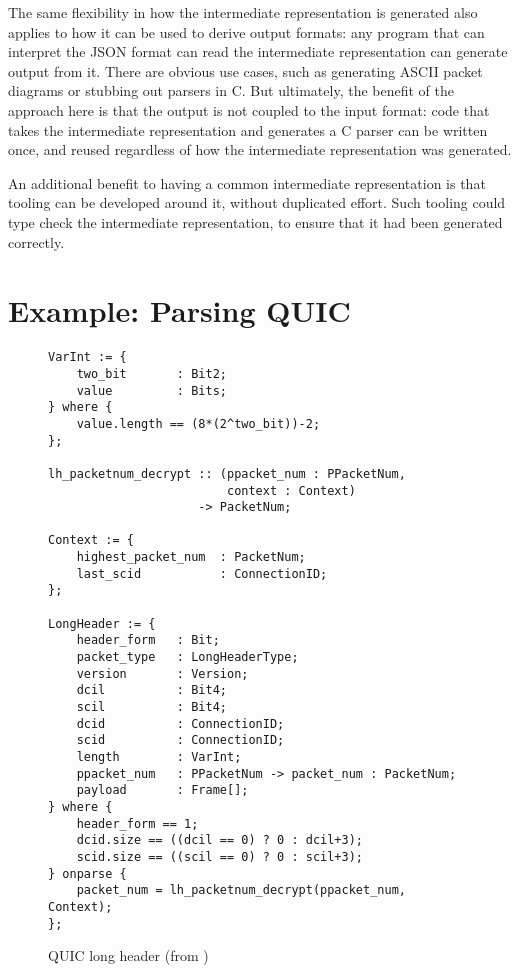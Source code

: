 \documentclass[10pt,sigconf]{acmart}
\begin{document}
The same flexibility in how the intermediate representation is generated also applies to
how it can be used to derive output formats: any program that can interpret the JSON
format can read the intermediate representation can generate output from it. There are
obvious use cases, such as generating ASCII packet diagrams or stubbing out parsers in C.
But ultimately, the benefit of the approach here is that the output is not coupled to the
input format: code that takes the intermediate representation and generates a C parser can
be written once, and reused regardless of how the intermediate representation was
generated.

An additional benefit to having a common intermediate representation is that tooling can
be developed around it, without duplicated effort. Such tooling could type check the
intermediate representation, to ensure that it had been generated correctly.

\section{Example: Parsing QUIC}
\label{sec:casestudy}

\begin{figure}
	\vspace{3mm}
    \begin{BVerbatim}[fontsize=\scriptsize]
VarInt := {
	two_bit       : Bit2;
	value         : Bits;
} where {
	value.length == (8*(2^two_bit))-2;
};

lh_packetnum_decrypt :: (ppacket_num : PPacketNum, 
                         context : Context) 
                     -> PacketNum;
                     
Context := {
	highest_packet_num  : PacketNum;
	last_scid           : ConnectionID;
};

LongHeader := {
	header_form   : Bit;
	packet_type   : LongHeaderType;
	version       : Version;
	dcil          : Bit4;
	scil          : Bit4;
	dcid          : ConnectionID;
	scid          : ConnectionID;
	length        : VarInt;
	ppacket_num   : PPacketNum -> packet_num : PacketNum;
	payload       : Frame[];
} where {
	header_form == 1;
	dcid.size == ((dcil == 0) ? 0 : dcil+3);
	scid.size == ((scil == 0) ? 0 : scil+3);
} onparse {
	packet_num = lh_packetnum_decrypt(ppacket_num, Context);
};
    \end{BVerbatim}
    \caption{QUIC long header (from \cite{draft-ietf-quic-transport-latest})}
    \label{fig:quic-long-hdr-desc}
\end{figure}
\end{document}
